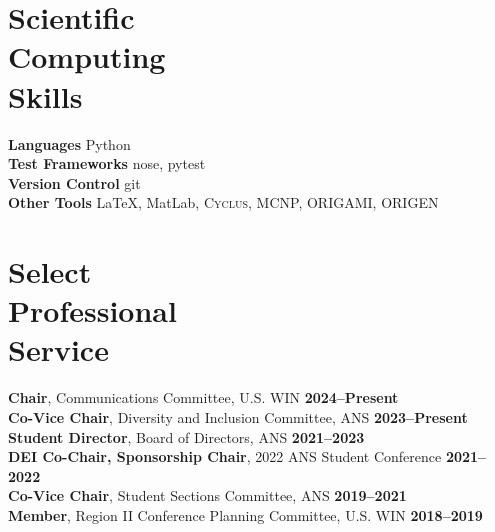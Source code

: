 \documentclass[margin,line]{resume}
\newcommand{\Cyclus}{\textsc{Cyclus}\xspace}%
\begin{document}
\begin{resume}
    \section{\mysidestyle Scientific\\Computing\\Skills}
                \textbf{Languages} \hfill Python\vspace{.5mm}\\%
                \textbf{Test Frameworks} \hfill nose, pytest\vspace{.5mm}\\%
                \textbf{Version Control} \hfill git\vspace{.5mm}\\%
                \textbf{Other Tools} \hfill \LaTeX, MatLab, \Cyclus, MCNP, ORIGAMI, ORIGEN\vspace{.5mm}%
        \vspace{-5mm}

    \section{\mysidestyle Select\\Professional\\Service}
        \textbf{Chair}, Communications Committee, U.S. WIN  \hfill \textbf{2024--Present}\\%
        \textbf{Co-Vice Chair}, Diversity and Inclusion Committee, ANS  \hfill \textbf{2023--Present}\vspace{.5mm}\\%
        \textbf{Student Director}, Board of Directors, ANS \hfill \textbf{2021--2023}\vspace{.5mm}\\%
        \textbf{DEI Co-Chair, Sponsorship Chair}, 2022 ANS Student Conference \hfill \textbf{2021--2022}\vspace{.5mm}\\%
        \textbf{Co-Vice Chair}, Student Sections Committee, ANS \hfill \textbf{2019--2021}\\
        \textbf{Member}, Region II Conference Planning Committee, U.S. WIN  \hfill \textbf{2018--2019}\vspace{0mm}\\%



\end{resume}
\end{document}
